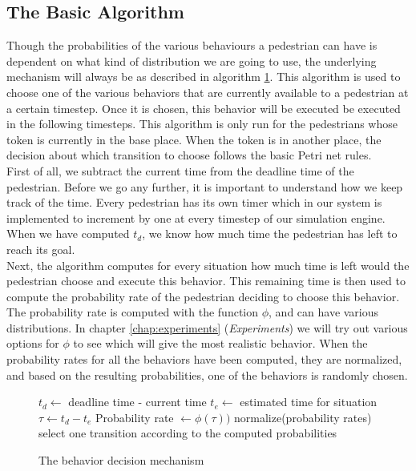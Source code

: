 \documentclass[11pt]{book}
\begin{document}
\subsection{The Basic Algorithm}
Though the probabilities of the various behaviours a pedestrian can have is dependent on what kind of distribution we are going to use, the underlying mechanism will always be as described in algorithm \ref{decisionmechanism}. This algorithm is used to choose one of the various behaviors that are currently available to a pedestrian at a certain timestep. Once it is chosen, this behavior will be executed be executed in the following timesteps. This algorithm is only run for the pedestrians whose token is currently in the base place. When the token is in another place, the decision about which transition to choose follows the basic Petri net rules.\\
First of all, we subtract the current time from the deadline time of the pedestrian.  Before we go any further, it is important to understand how we keep track of the time.  Every pedestrian has its own timer which in our system is implemented to increment by one at every timestep of our simulation engine. When we have computed $t_d$, we know how much time the pedestrian has left to reach its goal.\\
Next, the algorithm computes for every situation how much time is left would the pedestrian choose and execute this behavior. This remaining time is then used to compute the probability rate of the pedestrian deciding to choose this behavior. The probability rate is computed with the function $\phi$, and can have various distributions. In chapter \ref{chap:experiments} (\emph{Experiments}) we will try out various options for $\phi$ to see which will give the most realistic behavior. When the probability rates for all the behaviors have been computed, they are normalized, and based on the resulting probabilities, one of the behaviors is randomly chosen.

\begin{figure}
\begin{algorithm}
\caption{The behavior decision mechanism}
\label{decisionmechanism}
\begin{algorithmic}
\State $t_d \gets $ deadline time - current time 
\State $t_e \gets $ estimated time for situation
\State $\tau \gets t_d - t_e$
\State Probability rate $\gets \phi(\tau))$
\EndFor
\State normalize(probability rates)
\State select one transition according to the computed probabilities
\end{algorithmic}
\end{algorithm}
\end{figure}
\end{document}
